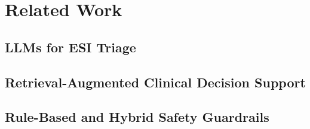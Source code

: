 \section{Related Work}\label{sec:related}
\subsection{LLMs for ESI Triage}
\subsection{Retrieval-Augmented Clinical Decision Support}
\subsection{Rule-Based and Hybrid Safety Guardrails}
